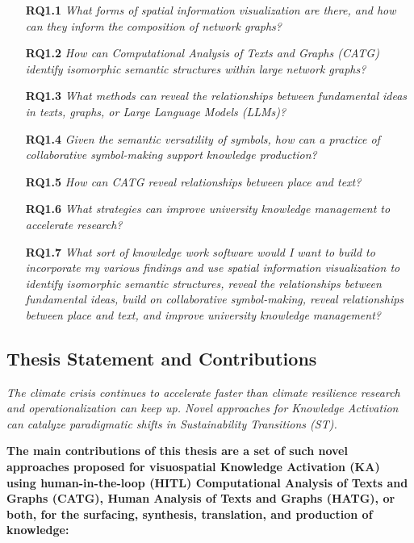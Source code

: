 \begin{enumerate}
    \item[\textbf{RQ1.1}] \textit{What forms of spatial information visualization are there, and how can they inform the composition of network graphs?}
    \item[\textbf{RQ1.2}] \textit{How can Computational Analysis of Texts and Graphs (CATG) identify isomorphic semantic structures within large network graphs?}
    \item[\textbf{RQ1.3}] \textit{What methods can reveal the relationships between fundamental ideas in texts, graphs, or Large Language Models (LLMs)?}
    \item[\textbf{RQ1.4}] \textit{Given the semantic versatility of symbols, how can a practice of collaborative symbol-making support knowledge production?}
    \item[\textbf{RQ1.5}] \textit{How can CATG reveal relationships between place and text?}
    \item[\textbf{RQ1.6}] \textit{What strategies can improve university knowledge management to accelerate research?}
    \item[\textbf{RQ1.7}] \textit{What sort of knowledge work software would I want to build to incorporate my various findings and use spatial information visualization to identify isomorphic semantic structures, reveal the relationships between fundamental ideas, build on collaborative symbol-making, reveal relationships between place and text, and improve university knowledge management?}
\end{enumerate}




\subsection{Thesis Statement and Contributions}


\textit{The climate crisis continues to accelerate faster than climate resilience research and operationalization can keep up. Novel approaches for Knowledge Activation can catalyze paradigmatic shifts in Sustainability Transitions (ST).}

\textbf{The main contributions of this thesis are a set of such novel approaches proposed for visuospatial Knowledge Activation (KA) using human-in-the-loop (HITL) Computational Analysis of Texts and Graphs (CATG), Human Analysis of Texts and Graphs (HATG), or both, for the surfacing, synthesis, translation, and production of knowledge:}

